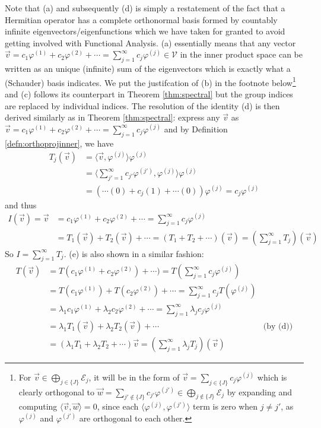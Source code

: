 Note that (a) and subsequently (d) is simply a restatement of the fact that a Hermitian operator has a complete orthonormal basis formed by countably infinite eigenvectors/eigenfunctions which we have taken for granted to avoid getting involved with Functional Analysis. (a) essentially means that any vector $\vec{v} = c_1\varphi^{(1)} + c_2\varphi^{(2)} + \cdots = \sum_{j=1}^{\infty}c_j\varphi^{(j)} \in \mathcal{V}$ in the inner product space can be written as an unique (infinite) sum of the eigenvectors which is exactly what a (Schauder) basis indicates. We put the justifcation of (b) in the footnote below\footnote{For $\vec{v} \in \bigoplus_{j \in \{J\}} \mathcal{E}_{j}$, it will be in the form of $\vec{v} = \sum_{j \in \{J\}} c_j\varphi^{(j)}$ which is clearly orthogonal to $\vec{w} = \sum_{j' \notin \{J\}} c_{j'}\varphi^{(j')} \in \bigoplus_{j \notin \{J\}} \mathcal{E}_{j}$ by expanding and computing $\langle \vec{v}, \vec{w} \rangle = 0$, since each $\langle \varphi^{(j)}, \varphi^{(j')} \rangle$ term is zero when $j \neq j'$, as $\varphi^{(j)}$ and $\varphi^{(j')}$ are orthogonal to each other.} and (c) follows its counterpart in Theorem \ref{thm:spectral} but the group indices are replaced by individual indices. The resolution of the identity (d) is then derived similarly as in Theorem \ref{thm:spectral}: express any $\vec{v}$ as $\vec{v} = c_1\varphi^{(1)} + c_2\varphi^{(2)} + \cdots = \sum_{j=1}^{\infty}c_j\varphi^{(j)}$ and by Definition \ref{defn:orthoprojinner}, we have
\begin{align*}
T_j(\vec{v}) &= \langle \vec{v}, \varphi^{(j)} \rangle \varphi^{(j)} \\
&= \langle \sum_{j'=1}^{\infty}c_{j'}\varphi^{(j')}, \varphi^{(j)} \rangle \varphi^{(j)} \\
&= (\cdots(0) + c_{j}(1) + \cdots(0))\varphi^{(j)} = c_j\varphi^{(j)}
\end{align*}
and thus
\begin{align*}
I(\vec{v}) = \vec{v} &= c_1\varphi^{(1)} + c_2\varphi^{(2)} + \cdots = \sum_{j=1}^{\infty}c_j\varphi^{(j)} \\
&= T_1(\vec{v}) + T_2(\vec{v}) + \cdots = (T_1 + T_2 + \cdots)(\vec{v}) = (\sum_{j=1}^{\infty}T_j)(\vec{v})
\end{align*}
So $I = \sum_{j=1}^{\infty}T_j$. (e) is also shown in a similar fashion:
\begin{align*}
T(\vec{v}) &= T(c_1\varphi^{(1)} + c_2\varphi^{(2)}) + \cdots) = T(\sum_{j=1}^{\infty}c_j\varphi^{(j)}) \\
&= T(c_1\varphi^{(1)}) + T(c_2\varphi^{(2)}) + \cdots = \sum_{j=1}^{\infty}c_jT(\varphi^{(j)}) \\
&= \lambda_1 c_1\varphi^{(1)} + \lambda_2 c_2\varphi^{(2)} + \cdots = \sum_{j=1}^{\infty} \lambda_jc_j\varphi^{(j)} \\
&= \lambda_1 T_1(\vec{v}) + \lambda_2 T_2(\vec{v}) + \cdots & \text{(by (d))} \\
&= (\lambda_1T_1 + \lambda_2T_2 + \cdots)\vec{v} = (\sum_{j=1}^{\infty} \lambda_jT_j)(\vec{v}) 
\end{align*}
